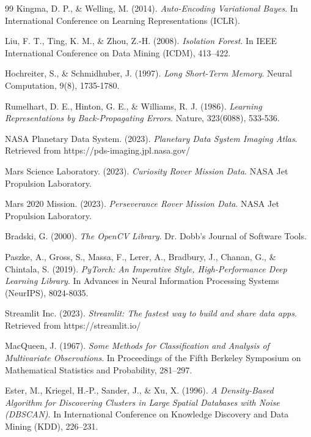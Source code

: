 \documentclass[12pt]{article}
\begin{document}
\begin{thebibliography}{99}
Kingma, D. P., \& Welling, M. (2014).
\textit{Auto-Encoding Variational Bayes}.
In International Conference on Learning Representations (ICLR).

Liu, F. T., Ting, K. M., \& Zhou, Z.-H. (2008).
\textit{Isolation Forest}.
In IEEE International Conference on Data Mining (ICDM), 413--422.

Hochreiter, S., \& Schmidhuber, J. (1997).
\textit{Long Short-Term Memory}.
Neural Computation, 9(8), 1735-1780.

Rumelhart, D. E., Hinton, G. E., \& Williams, R. J. (1986).
\textit{Learning Representations by Back-Propagating Errors}.
Nature, 323(6088), 533-536.

NASA Planetary Data System. (2023).
\textit{Planetary Data System Imaging Atlas}.
Retrieved from https://pds-imaging.jpl.nasa.gov/

Mars Science Laboratory. (2023).
\textit{Curiosity Rover Mission Data}.
NASA Jet Propulsion Laboratory.

Mars 2020 Mission. (2023).
\textit{Perseverance Rover Mission Data}.
NASA Jet Propulsion Laboratory.

Bradski, G. (2000).
\textit{The OpenCV Library}.
Dr. Dobb's Journal of Software Tools.

Paszke, A., Gross, S., Massa, F., Lerer, A., Bradbury, J., Chanan, G., \& Chintala, S. (2019).
\textit{PyTorch: An Imperative Style, High-Performance Deep Learning Library}.
In Advances in Neural Information Processing Systems (NeurIPS), 8024-8035.

Streamlit Inc. (2023).
\textit{Streamlit: The fastest way to build and share data apps}.
Retrieved from https://streamlit.io/

MacQueen, J. (1967).
\textit{Some Methods for Classification and Analysis of Multivariate Observations}.
In Proceedings of the Fifth Berkeley Symposium on Mathematical Statistics and Probability, 281--297.

Ester, M., Kriegel, H.-P., Sander, J., \& Xu, X. (1996).
\textit{A Density-Based Algorithm for Discovering Clusters in Large Spatial Databases with Noise (DBSCAN)}.
In International Conference on Knowledge Discovery and Data Mining (KDD), 226--231.

\end{thebibliography}
\end{document}

